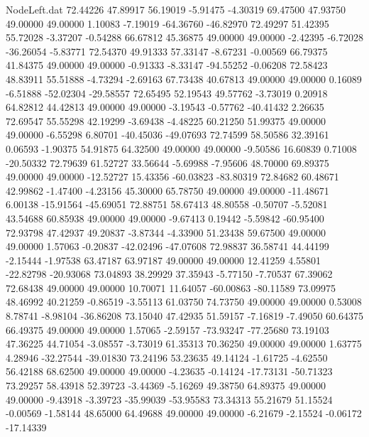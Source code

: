 \begin{filecontents}{NodeLeft.dat}
  72.44226   47.89917   56.19019    -5.91475   -4.30319   69.47500   47.93750   49.00000   49.00000    1.10083   -7.19019  -64.36760  -46.82970
  72.49297   51.42395   55.72028    -3.37207   -0.54288   66.67812   45.36875   49.00000   49.00000   -2.42395   -6.72028  -36.26054   -5.83771
  72.54370   49.91333   57.33147    -8.67231   -0.00569   66.79375   41.84375   49.00000   49.00000   -0.91333   -8.33147  -94.55252   -0.06208
  72.58423   48.83911   55.51888    -4.73294   -2.69163   67.73438   40.67813   49.00000   49.00000    0.16089   -6.51888  -52.02304  -29.58557
  72.65495   52.19543   49.57762    -3.73019    0.20918   64.82812   44.42813   49.00000   49.00000   -3.19543   -0.57762  -40.41432    2.26635
  72.69547   55.55298   42.19299    -3.69438   -4.48225   60.21250   51.99375   49.00000   49.00000   -6.55298    6.80701  -40.45036  -49.07693
  72.74599   58.50586   32.39161     0.06593   -1.90375   54.91875   64.32500   49.00000   49.00000   -9.50586   16.60839    0.71008  -20.50332
  72.79639   61.52727   33.56644    -5.69988   -7.95606   48.70000   69.89375   49.00000   49.00000  -12.52727   15.43356  -60.03823  -83.80319
  72.84682   60.48671   42.99862    -1.47400   -4.23156   45.30000   65.78750   49.00000   49.00000  -11.48671    6.00138  -15.91564  -45.69051
  72.88751   58.67413   48.80558    -0.50707   -5.52081   43.54688   60.85938   49.00000   49.00000   -9.67413    0.19442   -5.59842  -60.95400
  72.93798   47.42937   49.20837    -3.87344   -4.33900   51.23438   59.67500   49.00000   49.00000    1.57063   -0.20837  -42.02496  -47.07608
  72.98837   36.58741   44.44199    -2.15444   -1.97538   63.47187   63.97187   49.00000   49.00000   12.41259    4.55801  -22.82798  -20.93068
  73.04893   38.29929   37.35943    -5.77150   -7.70537   67.39062   72.68438   49.00000   49.00000   10.70071   11.64057  -60.00863  -80.11589
  73.09975   48.46992   40.21259    -0.86519   -3.55113   61.03750   74.73750   49.00000   49.00000    0.53008    8.78741   -8.98104  -36.86208
  73.15040   47.42935   51.59157    -7.16819   -7.49050   60.64375   66.49375   49.00000   49.00000    1.57065   -2.59157  -73.93247  -77.25680
  73.19103   47.36225   44.71054    -3.08557   -3.73019   61.35313   70.36250   49.00000   49.00000    1.63775    4.28946  -32.27544  -39.01830
  73.24196   53.23635   49.14124    -1.61725   -4.62550   56.42188   68.62500   49.00000   49.00000   -4.23635   -0.14124  -17.73131  -50.71323
  73.29257   58.43918   52.39723    -3.44369   -5.16269   49.38750   64.89375   49.00000   49.00000   -9.43918   -3.39723  -35.99039  -53.95583
  73.34313   55.21679   51.15524    -0.00569   -1.58144   48.65000   64.49688   49.00000   49.00000   -6.21679   -2.15524   -0.06172  -17.14339

\end{filecontents}
